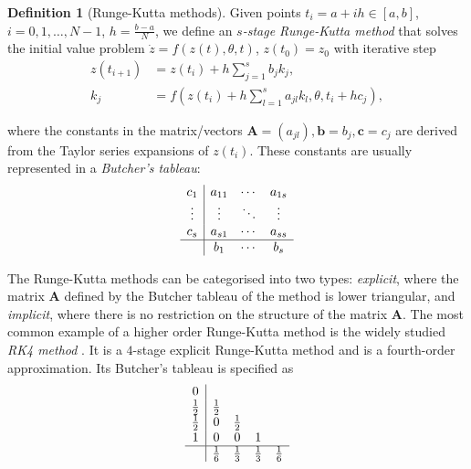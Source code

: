 \documentclass[a4paper,11pt,titlepage]{article}
\theoremstyle{definition}
\newtheorem{definition}{Definition}[section]
\theoremstyle{plain}
\theoremstyle{remark}
\begin{document}
\begin{definition}[Runge-Kutta methods]
    Given points $t_i = a + ih \in \left[a, b\right]$, $i = 0, 1, \dots, N - 1$, $h = \frac{b-a}{N}$, we define an $s$\textit{-stage Runge-Kutta method} that solves the initial value problem $\dot{z}= f(z(t), \theta,t)$, $z(t_0) = z_0$ with iterative step
    \begin{align*}
        z(t_{i+1}) &= z(t_i) + h\sum_{j=1}^s b_j k_j, \\
        k_j &= f\left(z(t_i) + h\sum_{l=1}^s a_{jl}k_l, \theta, t_i + hc_j\right),
    \end{align*}
    
    where the constants in the matrix/vectors $\mathbf{A} = (a_{jl}), \mathbf{b} = b_j, \mathbf{c} = c_j$ are derived from the Taylor series expansions of $z(t_i)$. These constants are usually represented in a \textit{Butcher's tableau}:
    \begin{equation*}
        \begin{array}{c|ccc}
            c_1 & a_{11} & \cdots & a_{1s} \\
            \vdots & \vdots & \ddots & \vdots  \\
            c_s & a_{s1} & \cdots & a_{ss} \\
            \hline
            & b_1 & \cdots & b_s
        \end{array}
    \end{equation*}
\end{definition}

The Runge-Kutta methods can be categorised into two types: \textit{explicit}, where the matrix $\mathbf{A}$ defined by the Butcher tableau of the method is lower triangular, and \textit{implicit}, where there is no restriction on the structure of the matrix $\mathbf{A}$. The most common example of a higher order Runge-Kutta method is the widely studied \textit{RK4 method} \cite{rungekuttasolvers}. It is a $4$-stage explicit Runge-Kutta method and is a fourth-order approximation. Its Butcher's tableau is specified as
\begin{equation*}
    \begin{array}{c|cccc}
        0  \\
        \frac{1}{2} & \frac{1}{2} \\
        \frac{1}{2} & 0 & \frac{1}{2} \\
        1 & 0 & 0 & 1 \\
        \hline
        & \frac{1}{6} & \frac{1}{3} & \frac{1}{3} & \frac{1}{6} \\
    \end{array}
\end{equation*}
\end{document}
